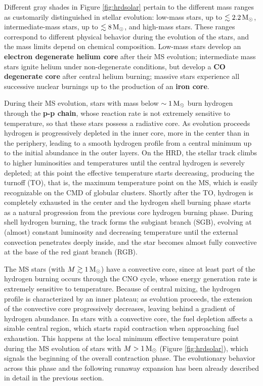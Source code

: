 \documentclass[a4paper,10pt]{article}
\begin{document}
{\noindent}Different gray shades in Figure \ref{fig:hrdsolar} pertain to the different mass ranges as customarily distinguished in stellar evolution: low-mass stars, up to $\lesssim2.2\,{\rm M_\odot}$, intermediate-mass stars, up to $\lesssim8\,{\rm M_\odot}$, and high-mass stars. These ranges correspond to different physical behavior during the evolution of the stars, and the mass limits depend on chemical composition. Low-mass stars develop an \textbf{electron degenerate helium core} after their MS evolution; intermediate mass stars ignite helium under non-degenerate conditions, but develop a \textbf{CO degenerate core} after central helium burning; massive stars experience all successive nuclear burnings up to the production of an \textbf{iron core}.

{\noindent}During their MS evolution, stars with mass below $\sim1\,{\rm M_\odot}$ burn hydrogen through the \textbf{p-p chain}, whose reaction rate is not extremely sensitive to temperature, so that these stars possess a radiative core. As evolution proceeds hydrogen is progressively depleted in the inner core, more in the center than in the periphery, leading to a smooth hydrogen profile from a central minimum up to the initial abundance in the outer layers. On the HRD, the stellar track climbs to higher luminosities and temperatures until the central hydrogen is severely depleted; at this point the effective temperature starts decreasing, producing the turnoff (TO), that is, the maximum temperature point on the MS, which is easily recognizable on the CMD of globular clusters. Shortly after the TO, hydrogen is completely exhausted in the center and the hydrogen shell burning phase starts as a natural progression from the previous core hydrogen burning phase. During shell hydrogen burning, the track forms the subgiant branch (SGB), evolving at (almost) constant luminosity and decreasing temperature until the external convection penetrates deeply inside, and the star becomes almost fully convective at the base of the red giant branch (RGB).

{\noindent}The MS stars (with $M\gtrsim1\,{\rm M_\odot}$) have a convective core, since at least part of the hydrogen burning occurs through the CNO cycle, whose energy generation rate is extremely sensitive to temperature. Because of central mixing, the hydrogen profile is characterized by an inner plateau; as evolution proceeds, the extension of the convective core progressively decreases, leaving behind a gradient of hydrogen abundance. In stars with a convective core, the fuel depletion affects a sizable central region, which starts rapid contraction when approaching fuel exhaustion. This happens at the local minimum effective temperature point during the MS evolution of stars with $M>1\,{\rm M_\odot}$ (Figure \ref{fig:hrdsolar}), which signals the beginning of the overall contraction phase. The evolutionary behavior across this phase and the following runaway expansion has been already described in detail in the previous section.
\end{document}
